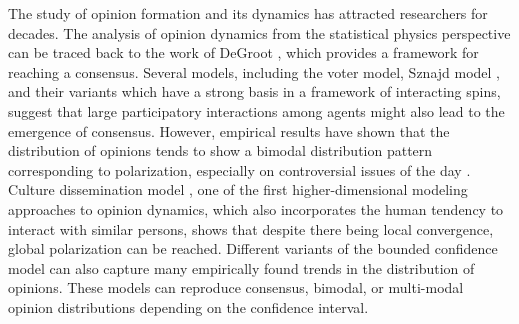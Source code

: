 \documentclass[%
 reprint,
superscriptaddress,
 amsmath,amssymb,
 aps,
 pre,
]{revtex4-1}
\begin{document}
The study of opinion formation and its dynamics has attracted researchers for decades. The analysis of opinion dynamics from the statistical physics perspective can be traced back to the work of DeGroot \cite{reaching-a-consensus}, which provides a framework for reaching a consensus. Several models, including the voter \cite{the-voter-model, reality-inspired-voter-models-a-mini-review} model, Sznajd model \cite{opinion-evolution-in-closed-community, sznajd-review}, and their variants which have a strong basis in a framework of interacting spins, suggest that large participatory interactions among agents might also lead to the emergence of consensus. However, empirical results have shown that the distribution of opinions tends to show a bimodal distribution pattern corresponding to polarization, especially on controversial issues of the day \cite{biased-assimilation-and-attitude-polarization, have-americans-social-attitudes-become-more-polarized, paritisans-without-constrait-political-polarization-and-trends}. Culture dissemination model \cite{the-dissemination-of-culture}, one of the first higher-dimensional modeling approaches to opinion dynamics, which also incorporates the human tendency to interact with similar persons, shows that despite there being local convergence, global polarization can be reached. 
Different variants of the bounded confidence model \cite{mixing-beliefs-among-interacting-agents, opinioin-dynamics-and-bounded-confidence} can also capture many empirically found trends in the distribution of opinions. These models can reproduce consensus, bimodal, or multi-modal opinion distributions depending on the confidence interval.
\end{document}
